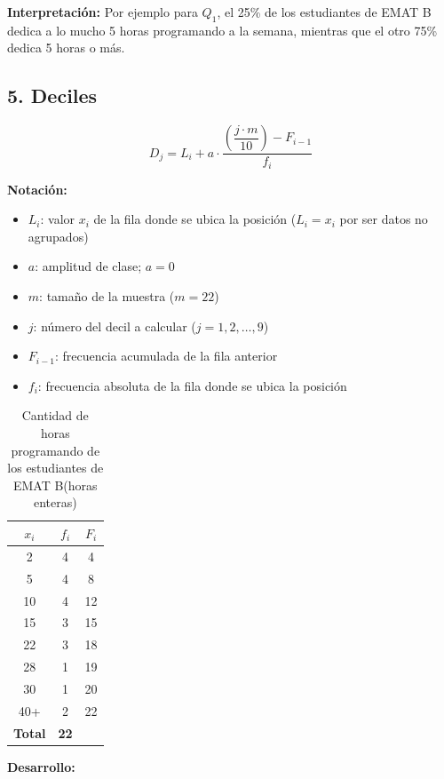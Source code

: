\documentclass[12pt,letterpaper]{article}
\begin{document}
\textbf{Interpretación:} Por ejemplo para $Q_1$, el 25\% de los estudiantes de EMAT B dedica a lo mucho 5 horas programando a la semana, mientras que el otro 75\% dedica 5 horas o más.

\subsection*{5. Deciles}
\begin{equation*}
    D_j = L_i + a \cdot \frac{\left(\dfrac{j \cdot m}{10}\right) - F_{i-1}}{f_i}
\end{equation*}

\textbf{Notación:}
\begin{itemize}
    \item $L_i$: valor $x_i$ de la fila donde se ubica la posición ($L_i = x_i$ por ser datos no agrupados)
    \item $a$: amplitud de clase; $a = 0$
    \item $m$: tamaño de la muestra ($m=22$)
    \item $j$: número del decil a calcular ($j=1,2,\dots,9$)
    \item $F_{i-1}$: frecuencia acumulada de la fila anterior
    \item $f_i$: frecuencia absoluta de la fila donde se ubica la posición
\end{itemize}

\begin{table}[H]
    \centering
    \caption{Cantidad de horas programando de los estudiantes de EMAT B(horas enteras)}
    \label{tab:mediana-cuantiles-horas}
    \begin{tabular}{@{}ccc@{}}
        \toprule
        $x_i$ & $f_i$ & $F_i$ \\
        \midrule
        2 & 4 & 4 \\
        5 & 4 & 8 \\
        10 & 4 & 12 \\
        15 & 3 & 15 \\
        22 & 3 & 18 \\
        28 & 1 & 19 \\
        30 & 1 & 20 \\
        40+ & 2 & 22 \\
        \midrule
        \textbf{Total} & \textbf{22} & \\
        \bottomrule
    \end{tabular}
\end{table}

\textbf{Desarrollo:}
\end{document}
